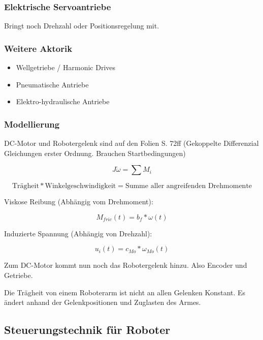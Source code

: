 \documentclass[a4paper]{article}
\begin{document}
\subsubsection{Elektrische Servoantriebe}

Bringt noch Drehzahl oder Positionsregelung mit.

\subsubsection{Weitere Aktorik}

\begin{itemize}
    \item Wellgetriebe / Harmonic Drives
    \item Pneumatische Antriebe
    \item Elektro-hydraulische Antriebe
\end{itemize}

\subsubsection{Modellierung}

DC-Motor und Robotergelenk sind auf den Folien S. 72ff (Gekoppelte Differenzial Gleichungen erster Ordnung. Brauchen Startbedingungen)

$$J \dot\omega = \sum M_i$$

$$\text{Trägheit} * \text{Winkelgeschwindigkeit} = \text{Summe aller angreifenden Drehmomente}$$


Viskose Reibung (Abhängig vom Drehmoment):

$$M_{fric}(t) = b_f * \omega(t)$$

Induzierte Spannung (Abhängig von Drehzahl):

$$u_i(t) = c_{Mo}*\omega_{Mo}(t)$$

Zum DC-Motor kommt nun noch das Robotergelenk hinzu. Also Encoder und Getriebe.

Die Trägheit von einem Roboterarm ist nicht an allen Gelenken Konstant. Es ändert anhand der Gelenkpositionen und Zuglasten des Armes.

\subsection{Steuerungstechnik für Roboter}
\end{document}
